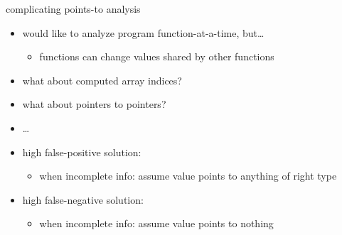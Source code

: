 \begin{frame}{complicating points-to analysis}
    \begin{itemize}
    \item would like to analyze program function-at-a-time, but\ldots
        \begin{itemize}
        \item functions can change values shared by other functions
        \end{itemize}
    \item what about computed array indices?
    \item what about pointers to pointers?
    \item \ldots
    \vspace{.5cm}
    \item high false-positive solution:
        \begin{itemize}
        \item when incomplete info: assume value points to anything of right type
        \end{itemize}
    \item high false-negative solution:
        \begin{itemize}
        \item when incomplete info: assume value points to nothing
        \end{itemize}
    \end{itemize}
\end{frame}
